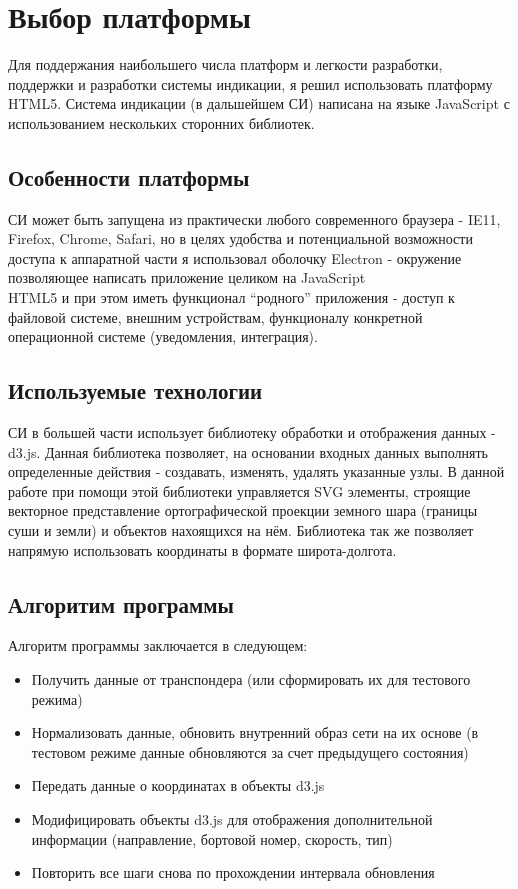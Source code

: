 \documentclass[a4paper,12pt]{report} %
\begin{document}
\section{Выбор платформы}
Для поддержания наибольшего числа платформ и легкости разработки, поддержки и
разработки системы индикации, я решил использовать платформу HTML5. Система
индикации (в дальшейшем СИ) написана на языке JavaScript с использованием
нескольких сторонних библиотек.

\subsection{Особенности платформы}
СИ может быть запущена из практически любого современного браузера - IE11,
Firefox, Chrome, Safari, но в целях удобства и потенциальной возможности доступа
к аппаратной части я использовал оболочку Electron - окружение позволяющее
написать приложение целиком на JavaScript\\HTML5 и при этом иметь функционал
``родного'' приложения - доступ к файловой системе, внешним устройствам,
функционалу конкретной операционной системе (уведомления, интеграция).

\subsection{Используемые технологии}
СИ в большей части использует библиотеку обработки и отображения данных - d3.js.
Данная библиотека позволяет, на основании входных данных выполнять определенные
действия - создавать, изменять, удалять указанные узлы. В данной работе при
помощи этой библиотеки управляется SVG элементы, строящие векторное
представление ортографической проекции земного шара (границы суши и земли) и
объектов нахоящихся на нём. Библиотека так же позволяет напрямую использовать
координаты в формате широта-долгота.

\subsection{Алгоритим программы}
Алгоритм программы заключается в следующем:
\begin{itemize}
\item Получить данные от транспондера (или сформировать их для тестового режима)
\item Нормализовать данные, обновить внутренний образ сети на их основе (в
  тестовом режиме данные обновляются за счет предыдущего состояния)
\item Передать данные о координатах в объекты d3.js
\item Модифицировать объекты d3.js для отображения дополнительной информации
  (направление, бортовой номер, скорость, тип)
\item Повторить все шаги снова по прохождении интервала обновления
\end{itemize}
\newpage
\end{document}
